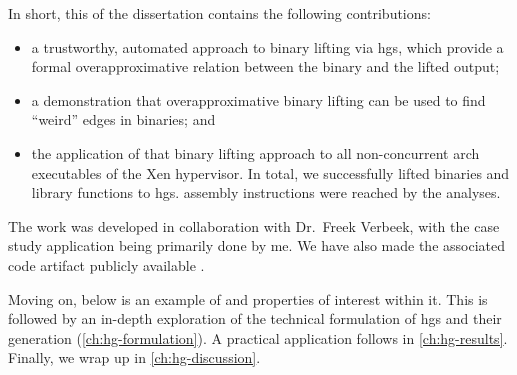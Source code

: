 In short, this  of the dissertation contains the following contributions:
\begin{itemize}
  \item a trustworthy, automated approach to binary lifting via \acp{hg}, which provide a formal overapproximative relation between the binary and the lifted output;
  \item a demonstration that overapproximative binary lifting can be used to find ``weird'' edges in binaries; and
  \item the application of that binary lifting approach to all non-concurrent \gls{arch} executables of the Xen hypervisor.
  In total, we successfully lifted  binaries and  library functions to \acp{hg}.
  assembly instructions were reached by the analyses.
\end{itemize}
The work was developed in collaboration with Dr.~Freek Verbeek, with the case study application being primarily done by me.
We have also made the associated code artifact publicly available \autocite{bockenek2022artifact}.

Moving on, below is an example of  and properties of interest within it.
This  is followed by an in-depth exploration of the technical formulation of \acp{hg} and their generation (\cref{ch:hg-formulation}).
A practical application follows in \cref{ch:hg-results}.
Finally, we wrap up in \cref{ch:hg-discussion}.


